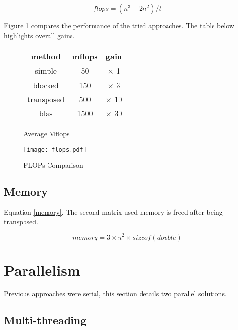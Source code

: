 \documentclass[a4paper,twocolumn]{article}
\begin{document}
\begin{equation}
flops = (n ^{3} - 2 n ^{2}) / t
\label{ops}
\end{equation}

\smallskip

Figure \ref{flops-table} compares the performance of the tried approaches.
The table below highlights overall gains.

\begin{figure}[H]
  \begin{center}
    \begin{tabular}{|c|c|c|}\hline
      {\bf method} & {\bf mflops} & {\bf gain} \\ \hline
      simple & 50 & $ \times $ 1 \\ \hline
      blocked & 150 & $ \times $ 3 \\ \hline
      transposed & 500 & $ \times $ 10 \\ \hline
      blas & 1500 & $ \times $ 30 \\ \hline
    \end{tabular}
    \caption{Average Mflops}
  \end{center}
  \label{flops-table}
\end{figure}

\begin{center}
  \begin{figure}[H]
    \texttt{[image: flops.pdf]}
    \caption{FLOPs Comparison}
    \label{flops}
  \end{figure}
\end{center}

\subsection{Memory}

Equation \ref{memory}.
The second matrix used memory is freed after being transposed.

\begin{equation}
memory = 3 \times n ^{2} \times sizeof(double)
\label{memory}
\end{equation}

\section{Parallelism}

Previous approaches were serial, this section details two parallel 
solutions.

\subsection{Multi-threading}
\end{document}
